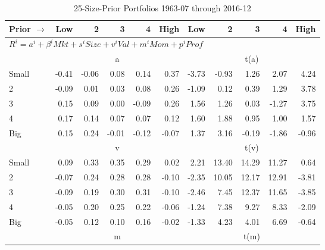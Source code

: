 
\begin{table}[!ht]
\footnotesize
\centering
\caption{25-Size-Prior Portfolios 1963-07 through 2016-12}
\begin{tabular}{lrrrrrrrrrr}
  \toprule
    Prior $\rightarrow$ & Low & 2 & 3 & 4 & High & Low & 2 & 3 & 4 & High \\ 
  \midrule
  \multicolumn{11}{l}{$R^i=a^i+\beta^iMkt+s^iSize+v^iVal+m^iMom+p^iProf$} \\

  
    
      & \multicolumn{5}{c}{a} & \multicolumn{5}{c}{t(a)}
    
    \\
      \cmidrule(r){2-6} \cmidrule(r){7-11}

    Small   & -0.41  & -0.06  & 0.08  & 0.14  & 0.37  & -3.73  & -0.93  & 1.26  & 2.07  & 4.24  \\
         2  & -0.09  & 0.01  & 0.03  & 0.08  & 0.26  & -1.09  & 0.12  & 0.39  & 1.29  & 3.78  \\
         3  & 0.15  & 0.09  & 0.00  & -0.09  & 0.26  & 1.56  & 1.26  & 0.03  & -1.27  & 3.75  \\
         4  & 0.17  & 0.14  & 0.07  & 0.07  & 0.12  & 1.60  & 1.88  & 0.95  & 1.00  & 1.57  \\
    Big     & 0.15  & 0.24  & -0.01  & -0.12  & -0.07  & 1.37  & 3.16  & -0.19  & -1.86  & -0.96  \\

  
    
      & \multicolumn{5}{c}{v} & \multicolumn{5}{c}{t(v)}
    
    \\
      \cmidrule(r){2-6} \cmidrule(r){7-11}

    Small   & 0.09  & 0.33  & 0.35  & 0.29  & 0.02  & 2.21  & 13.40  & 14.29  & 11.27  & 0.64  \\
         2  & -0.07  & 0.24  & 0.28  & 0.28  & -0.10  & -2.35  & 10.05  & 12.17  & 12.91  & -3.81  \\
         3  & -0.09  & 0.19  & 0.30  & 0.31  & -0.10  & -2.46  & 7.45  & 12.37  & 11.65  & -3.85  \\
         4  & -0.05  & 0.20  & 0.25  & 0.22  & -0.06  & -1.24  & 7.38  & 9.27  & 8.33  & -2.09  \\
    Big     & -0.05  & 0.12  & 0.10  & 0.16  & -0.02  & -1.33  & 4.23  & 4.01  & 6.69  & -0.64  \\

  
    
      & \multicolumn{5}{c}{m} & \multicolumn{5}{c}{t(m)}
    

\end{tabular}
\end{table}
